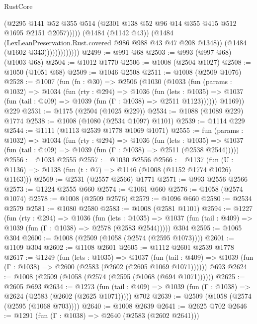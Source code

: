 \begin{lexlean}{RustCore}
\begin{coremodule}
                                (@2295
                                  @141
                                  @52
                                  @355
                                  @514
                                  (@2301 @138 @52 @96 @14 @355 @415 @512 @1695 @2151 @2057)))))
                          (@1484 (@1142 @43))
                          (@1484 (LexLeanPreservation.Rust.covered @986 @988 @43 @47 @208 @1348))
                          (@1484 (@1602 @343)))))))))))))
@2499 := @991 @68
@2503 := @993 (@997 @68) (@1003 @68)
@2504 := @1012 @1770
@2506 := @1008 (@2504 @1027)
@2508 := @1050 (@1051 @68)
@2509 := @1046 @2508
@2511 := @1008 (@2509 @1076)
@2528 := @1007
    (fun (fn : @30) =>
    @2506
      (@1030
        (@1033
          (fun (params : @1032) =>
          @1034
            (fun (rty : @294) =>
            @1036
              (fun (lets : @1035) =>
              @1037 (fun (tail : @409) => @1039 (fun (Γ : @1038) => @2511 @1123))))))
        @1169))
    @229
@2531 := @1175 (@2504 (@1025 @229))
@2534 := @1088 (@1089 @229) @1774
@2538 := @1008 (@1080 (@2534 @1097) @1101)
@2539 := @1114 @229
@2544 := @1111 (@1113 @2539 @1778 @1069 @1071)
@2555 := fun (params : @1032) =>
  @1034
    (fun (rty : @294) =>
    @1036
      (fun (lets : @1035) =>
      @1037 (fun (tail : @409) => @1039 (fun (Γ : @1038) => @2511 (@2538 @2544)))))
@2556 := @1033 @2555
@2557 := @1030 @2556
@2566 := @1137 (fun (U : @1136) => @1138 (fun (t : @7) => @1146 (@1008 (@1152 @1774 @1026) @1163)))
@2569 := @2531 (@2557 @2566) @1771
@2571 := @993 @2556 @2566
@2573 := @1224 @2555 @660
@2574 := @1061 @660
@2576 := @1058 (@2574 @1074)
@2578 := @1008 (@2509 @2576)
@2579 := @1096 @660
@2580 := @2534 @2579
@2581 := @1080 @2580
@2583 := @1008 (@2581 @1101)
@2594 := @1227
    (fun (rty : @294) =>
    @1036
      (fun (lets : @1035) =>
      @1037 (fun (tail : @409) => @1039 (fun (Γ : @1038) => @2578 (@2583 @2544)))))
    @304
@2595 := @1065 @304
@2600 := @1008 (@2509 (@1058 (@2574 (@2595 @1073))))
@2601 := @1109 @304
@2602 := @1108 @2601
@2605 := @1112 @2601 @2539 @1778
@2617 := @1249
    (fun (lets : @1035) =>
    @1037
      (fun (tail : @409) => @1039 (fun (Γ : @1038) => @2600 (@2583 (@2602 (@2605 @1069 @1071))))))
    @693
@2624 := @1008 (@2509 (@1058 (@2574 (@2595 (@1068 (@694 @1071))))))
@2625 := @2605 @693
@2634 := @1273
    (fun (tail : @409) => @1039 (fun (Γ : @1038) => @2624 (@2583 (@2602 (@2625 @1071)))))
    @702
@2639 := @2509 (@1058 (@2574 (@2595 (@1068 @703))))
@2640 := @1008 @2639
@2641 := @2625 @702
@2646 := @1291 (fun (Γ : @1038) => @2640 (@2583 (@2602 @2641)))

\end{coremodule}
\end{lexlean}
